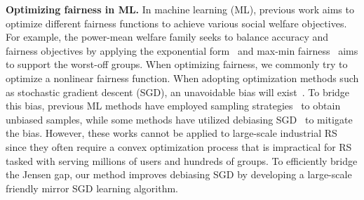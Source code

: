 \textbf{Optimizing fairness in ML.} In machine learning (ML), previous work aims to optimize different fairness functions to achieve various social welfare objectives. For example, the power-mean welfare family seeks to balance accuracy and fairness objectives by applying the exponential form~\citep{cousins2021axiomatic, cousins2023revisiting} and max-min fairness~\citep{abernethy2022active, agarwal2018reductions} aims to support the worst-off groups. When optimizing fairness, we commonly try to optimize a nonlinear fairness function. When adopting optimization methods such as stochastic gradient descent (SGD), an unavoidable bias will exist~\citep{demidovich2023guide, hu2020biased}. To bridge this bias, previous ML methods have employed sampling strategies~\citep{abernethy2022active, cousins2022uncertainty} to obtain unbiased samples, while some methods have utilized debiasing SGD~\citep{demidovich2023guide, agarwal2018reductions} to mitigate the bias. However, these works cannot be applied to large-scale industrial RS since they often require a convex optimization process that is impractical for RS tasked with serving millions of users and hundreds of groups. To efficiently bridge the Jensen gap, our method improves debiasing SGD by developing a large-scale friendly mirror SGD learning algorithm. 







